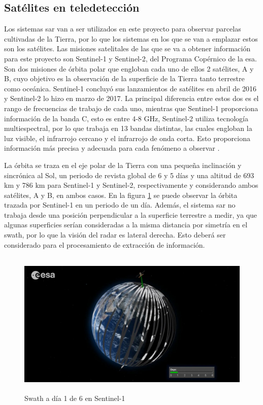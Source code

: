 \subsection{Satélites en teledetección}
\par Los sistemas \gls{sar} van a ser utilizados en este proyecto para observar parcelas cultivadas de la Tierra, por lo que los sistemas en los que se van a emplazar estos son los satélites. Las misiones satelitales de las que se va a obtener información para este proyecto son Sentinel-1 y Sentinel-2, del Programa Copérnico de la \gls{esa}. Son dos misiones de órbita polar que engloban cada uno de ellos 2 satélites, A y B, cuyo objetivo es la observación de la superficie de la Tierra tanto terrestre como oceánica. Sentinel-1 concluyó sus lanzamientos de satélites en abril de 2016 y Sentinel-2 lo hizo en marzo de 2017. La principal diferencia entre estos dos es el rango de frecuencias de trabajo de cada uno, mientras que Sentinel-1  proporciona información de la banda C, esto es entre 4-8 GHz, Sentinel-2 utiliza tecnología multiespectral, por lo que trabaja en 13 bandas distintas, las cuales engloban la luz visible, el infrarrojo cercano y el infrarrojo de onda corta. Esto proporciona información más precisa y adecuada para cada fenómeno a observar \cite{copernicusOV}. 
\\
\par La órbita se traza en el eje polar de la Tierra con una pequeña inclinación y sincrónica al Sol, un periodo de revista global de 6 y 5 días y una altitud de 693 km y 786  km para Sentinel-1 y Sentinel-2, respectivamente y considerando ambos satélites, A y B, en ambos casos. En la figura \ref{fig:swath} se puede observar la órbita trazada por Sentinel-1 en un periodo de un día. Además, el sistema \gls{sar} no trabaja desde una posición perpendicular a la superficie terrestre a medir, ya que algunas superficies serían consideradas a la misma distancia por simetría en el swath, por lo que la visión del radar es lateral derecha. Esto deberá ser considerado para el procesamiento de extracción de información. 
\\
\begin{figure}[h]
    \centering
    \includegraphics[height=7cm]{archivos/tfg/swathS1} %
    \caption{Swath a día 1 de 6 en Sentinel-1 \cite{ESAcons}}
    \label{fig:swath}
\end{figure}
